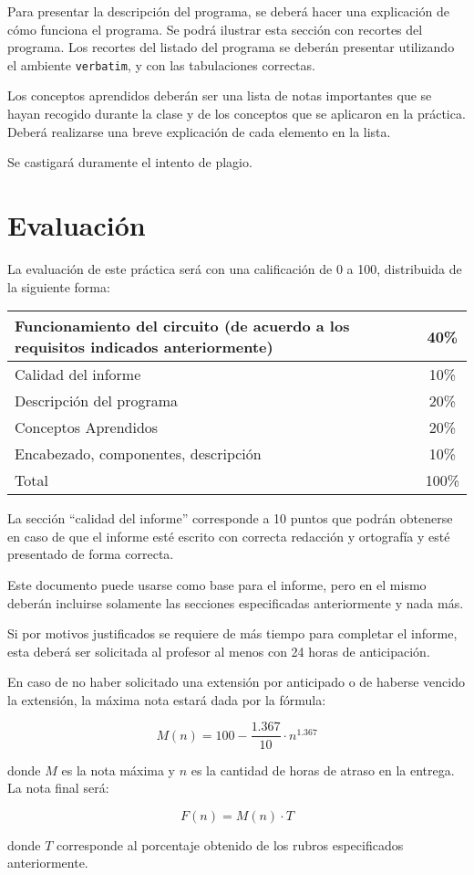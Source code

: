 \documentclass[12pt,letterpaper]{IEEEtran}
\begin{document}
Para presentar la descripción del programa, se deberá hacer una explicación de cómo funciona el programa. Se podrá ilustrar esta sección con recortes del programa. Los recortes del listado del programa se deberán presentar utilizando el ambiente \texttt{verbatim}, y con las tabulaciones correctas. 

Los conceptos aprendidos deberán ser una lista de notas importantes que se hayan recogido durante la clase y de los conceptos que se aplicaron en la práctica. Deberá realizarse una breve explicación de cada elemento en la lista.

Se castigará duramente el intento de plagio.

\section{Evaluación}

La evaluación de este práctica será con una calificación de 0 a 100, distribuida de la siguiente forma:

\begin{center}
 \begin{tabular}{p{}|c}\hline
   Funcionamiento del circuito (de acuerdo a los requisitos indicados anteriormente) 					     & 40\% \\\hline
   Calidad del informe	  				& 10\% \\\hline
   Descripción del programa				& 20\% \\\hline
   Conceptos Aprendidos					& 20\% \\\hline
   Encabezado, componentes, descripción & 10\% \\\hline\hline
   Total								& 100\% \\
 \end{tabular}
\end{center}

La sección ``calidad del informe'' corresponde a 10 puntos que podrán obtenerse en caso de que el informe esté escrito con correcta redacción y ortografía y esté presentado de forma correcta.

Este documento puede usarse como base para el informe, pero en el mismo deberán incluirse solamente las secciones especificadas anteriormente y nada más.

Si por motivos justificados se requiere de más tiempo para completar el informe, esta deberá ser solicitada al profesor al menos con 24 horas de anticipación.

En caso de no haber solicitado una extensión por anticipado o de haberse vencido la extensión, la máxima nota estará dada por la fórmula:

\[ M(n) = 100-\frac{1.367}{10}\cdot n^{1.367} \]

donde $M$ es la nota máxima y $n$ es la cantidad de horas de atraso en la entrega. La nota final será:

\[ F(n) = M(n)\cdot T \]

donde $T$ corresponde al porcentaje obtenido de los rubros especificados anteriormente.
\end{document}
